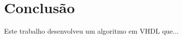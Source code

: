 \documentclass[12pt]{article}
\begin{document}




\section{Conclus\~ao}\label{sec:figs}

Este trabalho desenvolveu um algoritmo em VHDL que...









\end{document}
